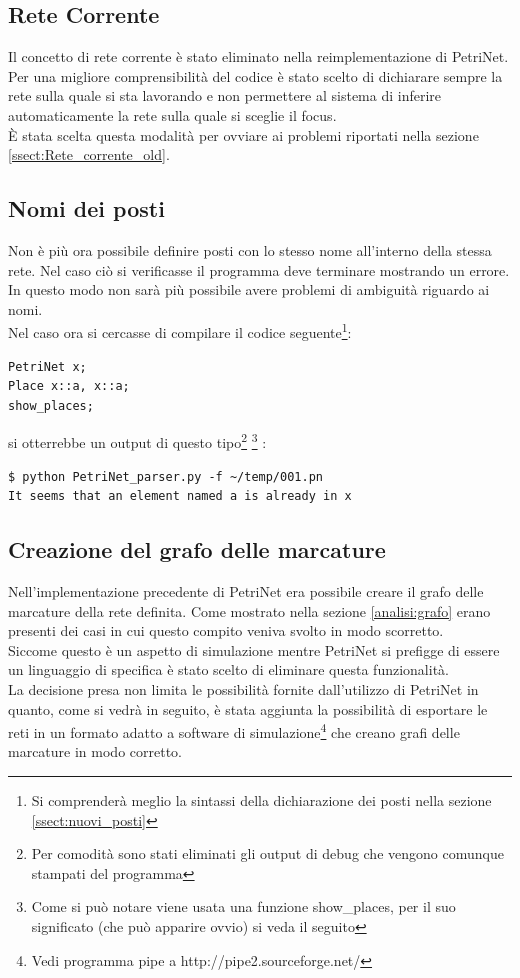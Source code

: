 \documentclass[italian,12pt]{book}
\begin{document}
\subsection{Rete Corrente}\label{ssect:rete_corrente_new}
Il concetto di rete corrente è stato eliminato nella reimplementazione di PetriNet. Per 
una migliore comprensibilità del codice è stato scelto di dichiarare sempre la rete sulla quale si 
sta lavorando e non permettere al sistema di inferire automaticamente la rete sulla quale 
si sceglie il focus.\\
È stata scelta questa modalità per ovviare ai problemi riportati nella sezione 
\ref{ssect:Rete_corrente_old}.

\subsection{Nomi dei posti}
Non è più ora possibile definire posti con lo stesso nome all'interno della stessa rete. Nel 
caso ciò si verificasse il programma deve terminare mostrando un errore. In questo modo non sarà 
più possibile avere problemi di ambiguità riguardo ai nomi.\\
Nel caso ora si cercasse di compilare il codice seguente\footnote{Si comprenderà meglio la sintassi della 
dichiarazione dei posti nella sezione \ref{ssect:nuovi_posti}}:
\begin{verbatim}PetriNet x;
Place x::a, x::a;
show_places;
\end{verbatim}
si otterrebbe un output di questo tipo\footnote{Per comodità sono stati eliminati gli output di 
debug che vengono comunque stampati del programma} \footnote{Come si può notare viene usata una 
funzione show\_places, per il suo significato (che può apparire ovvio) si veda il seguito} :
\begin{verbatim}
$ python PetriNet_parser.py -f ~/temp/001.pn 
It seems that an element named a is already in x
\end{verbatim}

\subsection{Creazione del grafo delle marcature}\label{ssect:creazione_grafo_marcature}
Nell'implementazione precedente di PetriNet era possibile creare il grafo delle 
marcature della rete definita. Come mostrato nella sezione \ref{analisi:grafo} erano presenti 
dei casi in cui questo compito veniva svolto in modo scorretto. \\
Siccome questo è un aspetto di simulazione mentre PetriNet 
si prefigge di essere un linguaggio di specifica è stato scelto di eliminare questa funzionalità. \\
La decisione presa non limita le possibilità fornite dall'utilizzo di PetriNet in quanto, come
si vedrà in seguito, è stata aggiunta la possibilità di esportare le reti in un formato adatto a 
software di simulazione\footnote{Vedi programma pipe a http://pipe2.sourceforge.net/} che creano 
grafi delle marcature in modo corretto.
\end{document}
